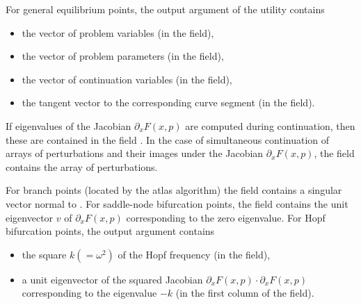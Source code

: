 For general equilibrium points,  the  output argument of the  utility contains
\begin{itemize}
\item the vector of problem variables (in the  field),
\item the vector of problem parameters (in the  field),
\item the vector of continuation variables (in the  field),
\item the tangent vector to the corresponding curve segment (in the  field).
\end{itemize}
If eigenvalues of the Jacobian $\partial_x F(x,p)$ are computed during continuation, then these are contained in the field . In the case of simultaneous continuation of arrays of perturbations and their images under the Jacobian $\partial_x F(x,p)$, the field  contains the array of perturbations.

For branch points (located by the atlas algorithm) the  field contains a singular vector normal to . For saddle-node bifurcation points, the field  contains the unit eigenvector $v$ of $\partial_xF(x,p)$ corresponding to the zero eigenvalue. For Hopf bifurcation points, the  output argument contains 
\begin{itemize}
\item the square $k(=\omega^2)$ of the Hopf frequency (in the  field),
\item a unit eigenvector of the squared Jacobian $\partial_xF(x,p)\cdot \partial_xF(x,p)$ corresponding to the eigenvalue $-k$ (in the first column of the  field).
\end{itemize}

